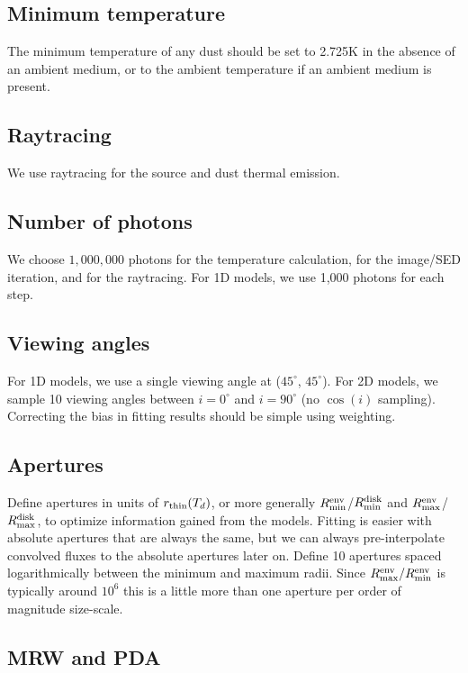 \documentclass[10pt]{article}
\newcommand{\rmind}{R^{\rm disk}_{\rm min}}
\newcommand{\rmaxd}{R^{\rm disk}_{\rm max}}
\newcommand{\rmine}{R^{\rm env}_{\rm min}}
\newcommand{\rmaxe}{R^{\rm env}_{\rm max}}
\begin{document}
\subsection{Minimum temperature}

The minimum temperature of any dust should be set to 2.725K in the absence of an ambient medium, or to the ambient temperature if an ambient medium is present.

\subsection{Raytracing}

We use raytracing for the source and dust thermal emission.

\subsection{Number of photons}

We choose $1,000,000$ photons for the temperature calculation, for the image/SED iteration, and for the raytracing. For 1D models, we use 1,000 photons for each step.

\subsection{Viewing angles}

For 1D models, we use a single viewing angle at ($45^\circ$, $45^\circ$). For 2D models, we sample 10 viewing angles between $i=0^\circ$ and $i=90^\circ$ (no $\cos(i)$ sampling). Correcting the bias in fitting results should be simple using weighting.

\subsection{Apertures}

Define apertures in units of $r_{\rm thin}(T_d)$, or more generally $\rmine$/$\rmind$ and $\rmaxe$/$\rmaxd$, to optimize information gained from the models. Fitting is easier with absolute apertures that are always the same, but we can always pre-interpolate convolved fluxes to the absolute apertures later on. Define 10 apertures spaced logarithmically between the minimum and maximum radii. Since $\rmaxe/\rmine$ is typically around $10^6$ this is a little more than one aperture per order of magnitude size-scale.

\subsection{MRW and PDA}
\end{document}
